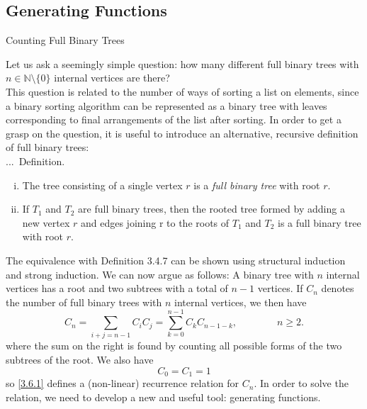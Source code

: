 \documentclass[smaller,hyperref={CJKbookmarks=true}]{beamer}
\newcommand{\N}{\mathbb{N}} \newcommand{\Z}{\mathbb{Z}} \newcommand{\Q}{\mathbb{Q}}
\newcounter{zhuo}[subsection]
\renewcommand{\thezhuo}{\thesection.\thesubsection.\arabic{zhuo}}
\newenvironment{DEFINITION}{\stepcounter{zhuo}\alert{\thezhuo.~Definition.\,}}{}
\begin{document}
\subsection{Generating Functions}
\begin{frame}[c] \begin{spacing}{2.5}
\tableofcontents[sectionstyle=hide,subsectionstyle=show/shaded/hide] \end{spacing}
\end{frame}
\begin{frame}{Counting Full Binary Trees}
\begin{spacing}{1.05}
Let us ask a seemingly simple question: how many different full binary
trees with $n\in\N\setminus\{0\}$ internal vertices are there?\\[6pt]
This question is related to the number of ways of sorting a list on elements,
since a binary sorting algorithm can be represented as a binary tree with
leaves corresponding to final arrangements of the list after sorting.
In order to get a grasp on the question, it is useful to introduce an
alternative, recursive definition of full binary trees:\\[5pt]
\begin{DEFINITION}
\begin{enumerate}[(i)]
  \item The tree consisting of a single vertex $r$ is a \emph{full binary tree} with root $r$.
  \item If $T_1$ and $T_2$ are full binary trees, then the rooted tree formed by adding a new vertex $r$ and edges joining r to the roots of $T_1$ and $T_2$ is a full binary tree with root $r$.
\end{enumerate}
The equivalence with Definition 3.4.7 can be shown using structural
induction and strong induction.
\end{DEFINITION}
\newpage
We can now argue as follows: A binary tree with $n$ internal vertices has a
root and two subtrees with a total of $n -1$ vertices. If $C_n$ denotes the
number of full binary trees with $n$ internal vertices, we then have
\setcounter{equation}{0}
\begin{equation}\label{3.6.1}
C_n=\sum_{i+j=n-1}C_iC_j=\sum_{k=0}^{n-1}C_kC_{n-1-k},\qquad\qquad
n\geq2.
\end{equation}
where the sum on the right is found by counting all possible forms of the
two subtrees of the root. We also have
\[C_0=C_1=1\]
so \eqref{3.6.1} defines a (non-linear) recurrence relation for $C_n$. In order to
solve the relation, we need to develop a new and useful tool: generating
functions.
\end{spacing}
\end{frame}
\end{document}
